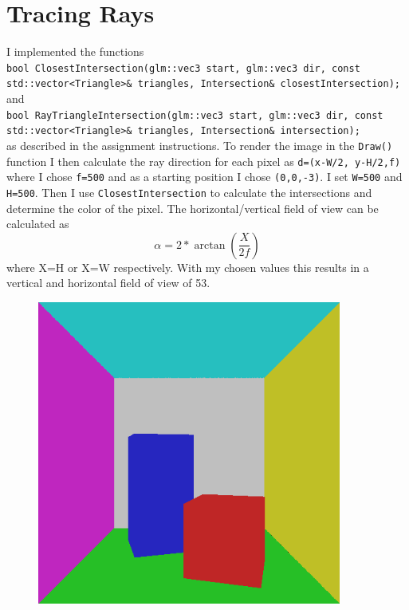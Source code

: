 \section{Tracing Rays} 
I implemented the functions\\
\texttt{bool ClosestIntersection(glm::vec3 start, glm::vec3 dir, const std::vector<Triangle>\& triangles, Intersection\& closestIntersection);}\\
and\\
\texttt{bool RayTriangleIntersection(glm::vec3 start, glm::vec3 dir, const std::vector<Triangle>\& triangles, Intersection\& intersection);}\\ 
as described in the assignment
instructions. To render the image in the \texttt{Draw()} function I then calculate the ray direction for each pixel as \texttt{d=(x-W/2, y-H/2,f)} where I chose 
\texttt{f=500} and as a starting position I chose \texttt{(0,0,-3)}. I set \texttt{W=500} and \texttt{H=500}. 
Then I use \texttt{ClosestIntersection} to calculate the intersections and determine the color of the pixel.
The horizontal/vertical field of view can be calculated as 
\begin{equation}
    \alpha=2*\arctan(\frac{X}{2f})
\end{equation}
where X=H or X=W respectively. With my chosen values this results in a vertical and horizontal field of view of 53\degree.
\begin{figure}[ht]
    \centering
    \includegraphics[width=10cm]{screenshots/tracing_rays.png}
\end{figure}
\clearpage

